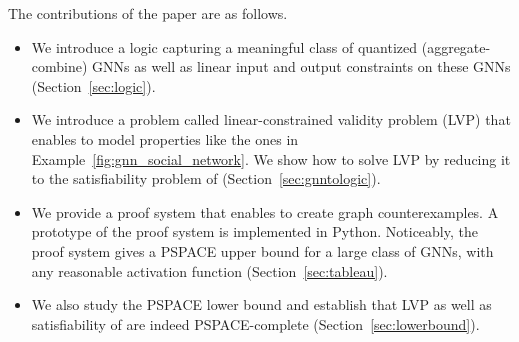 The contributions of the paper are as follows.
\begin{itemize}
\item We introduce a logic \thelogic{} capturing a meaningful class of quantized (aggregate-combine) GNNs as well as linear input and output constraints on these GNNs (Section~\ref{sec:logic}).
\item We introduce a problem called linear-constrained validity problem (LVP) that enables to model properties like the ones in Example~\ref{fig:gnn_social_network}. We show how to solve LVP by reducing it to the satisfiability problem of \thelogic{} (Section~\ref{sec:gnntologic}).
\item We provide a proof system that enables to create graph counterexamples. A prototype of the proof system is implemented in Python. Noticeably, the proof system gives a PSPACE upper bound for a large class of GNNs, with any reasonable activation function (Section~\ref{sec:tableau}).
\item We also study the PSPACE lower bound and establish that LVP as well as satisfiability of \thelogic{} 
are indeed PSPACE-complete (Section~\ref{sec:lowerbound}).
\end{itemize}






